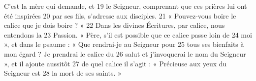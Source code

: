 C'est la mère qui demande, et	 
19	 	le Seigneur, comprenant que ces prières lui ont été inspirées	 
20	 	par ses fils, s'adresse aux disciples.	 
21	 	« Pouvez-vous boire le calice que je dois boire ? »	 
22	 	Dans les divines Écritures, par calice, nous entendons la	 
23	 	Passion. « Père, s'il est possible que ce calice passe loin de	 
24	 	moi », et dans le psaume : « Que rendrai-je au Seigneur pour	 
25	 	tous ses bienfaits à mon égard ? Je prendrai le calice du	 
26	 	salut et j'invoquerai le nom du Seigneur », et il ajoute aussitôt	 
27	 	de quel calice il s'agit : « Précieuse aux yeux du Seigneur est	 
28	 	la mort de ses saints. »	 
 